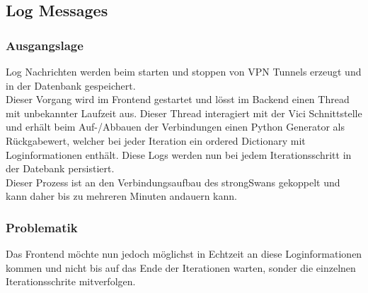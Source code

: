 \newpage
\subsection{Log Messages}
\subsubsection{Ausgangslage}
Log Nachrichten werden beim  starten und stoppen von VPN Tunnels erzeugt und in der Datenbank gespeichert. \\
Dieser Vorgang wird im Frontend gestartet und lösst im Backend einen Thread mit unbekannter Laufzeit aus. Dieser Thread interagiert mit der Vici Schnittstelle und erhält beim Auf-/Abbauen der Verbindungen einen Python Generator als Rückgabewert, welcher bei jeder Iteration ein ordered Dictionary mit Loginformationen enthält. Diese Logs werden nun bei jedem Iterationsschritt in der Datebank persistiert.\\ Dieser Prozess ist an den Verbindungsaufbau des strongSwans gekoppelt und kann daher bis zu mehreren Minuten andauern kann.

\subsubsection{Problematik}
Das Frontend möchte nun jedoch möglichst in Echtzeit an diese Loginformationen kommen und nicht bis auf das Ende der Iterationen warten, sonder die einzelnen Iterationsschrite mitverfolgen.


